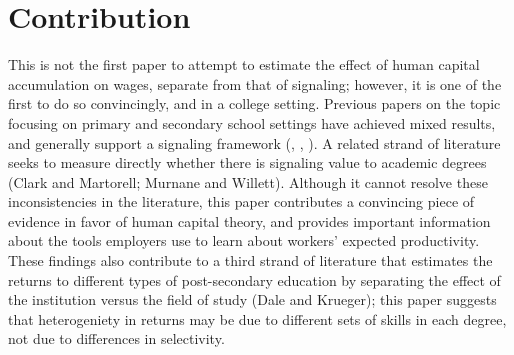 \documentclass[a4paper, 11pt]{article}
\begin{document}
\section*{Contribution}

This is not the first paper to attempt to estimate the effect of human capital accumulation on wages, separate from that of signaling; however, it is one of the first to do so convincingly, and in a college setting.  Previous papers on the topic focusing on primary and secondary school settings have achieved mixed results, and generally support a signaling framework (\cite{hu16}, \cite{bedard01}, \cite{lang86}).  A related strand of literature seeks to measure directly whether there is signaling value to academic degrees (Clark and Martorell; Murnane and Willett).  Although it cannot resolve these inconsistencies in the literature, this paper contributes a convincing piece of evidence in favor of human capital theory, and provides important information about the tools employers use to learn about workers' expected productivity.  These findings also contribute to a third strand of literature that estimates the returns to different types of post-secondary education by separating the effect of the institution versus the field of study (Dale and Krueger); this paper suggests that heterogeniety in returns may be due to different sets of skills in each degree, not due to differences in selectivity.
\end{document}
